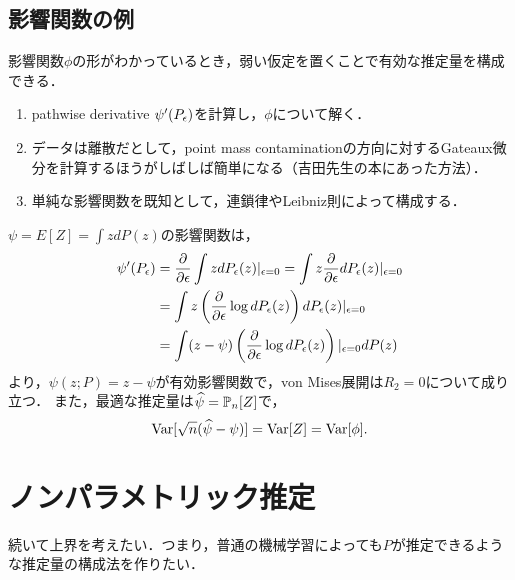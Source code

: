 \documentclass[uplatex,dvipdfmx]{jsreport}
\begin{document}
\subsection{影響関数の例}

\begin{tcolorbox}[colframe=ForestGreen, colback=ForestGreen!10!white,breakable,colbacktitle=ForestGreen!40!white,coltitle=black,fonttitle=\bfseries\sffamily,
title=]
    影響関数$\phi$の形がわかっているとき，弱い仮定を置くことで有効な推定量を構成できる．
\end{tcolorbox}

\begin{discussion}[影響関数の求め方]\mbox{}
    \begin{enumerate}
        \item pathwise derivative $\psi'(P_\epsilon)$を計算し，$\phi$について解く．
        \item データは離散だとして，point mass contaminationの方向に対するGateaux微分を計算するほうがしばしば簡単になる（吉田先生の本にあった方法）．
        \item 単純な影響関数を既知として，連鎖律やLeibniz則によって構成する．
    \end{enumerate}
\end{discussion}

\begin{example}[平均]
    $\psi=E[Z]=\int zdP(z)$の影響関数は，
    \begin{align*}
        \psi'(P_\epsilon)&=\frac{\partial }{\partial \epsilon}\int zdP_\epsilon(z)|_{\epsilon=0}=\int z\frac{\partial }{\partial \epsilon}dP_\epsilon(z)|_{\epsilon=0}\\
        &=\int z\left(\frac{\partial }{\partial \epsilon}\log dP_\epsilon(z)\right)dP_\epsilon(z)|_{\epsilon=0}\\
        &=\int(z-\psi)\left(\frac{\partial }{\partial \epsilon}\log dP_\epsilon(z)\right)|_{\epsilon=0}dP(z)
    \end{align*}
    より，$\psi(z;P)=z-\psi$が有効影響関数で，von Mises展開は$R_2=0$について成り立つ．
    また，最適な推定量は$\widehat{\psi}=\mathbb{P}_n[Z]$で，
    \[\mathrm{Var}[\sqrt{n}(\widehat{\psi}-\psi)]=\mathrm{Var}[Z]=\mathrm{Var}[\phi].\]
\end{example}

\section{ノンパラメトリック推定}

\begin{tcolorbox}[colframe=ForestGreen, colback=ForestGreen!10!white,breakable,colbacktitle=ForestGreen!40!white,coltitle=black,fonttitle=\bfseries\sffamily,
title=]
    続いて上界を考えたい．つまり，普通の機械学習によっても$P$が推定できるような推定量の構成法を作りたい．
\end{tcolorbox}
\end{document}
